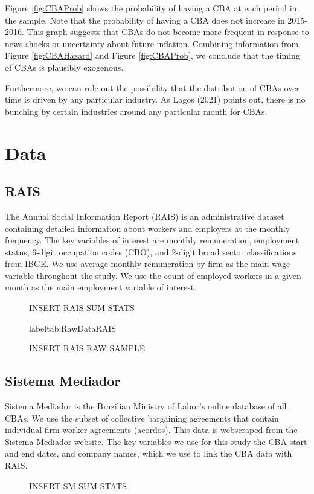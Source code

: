 \documentclass[12pt]{article}
\begin{document}
		Figure \ref{fig:CBAProb} shows the probability of having a CBA at each period in the sample. Note that the probability of having a CBA does not increase in 2015-2016. This graph suggests that CBAs do not become more frequent in response to news shocks or uncertainty about future inflation.
		Combining information from Figure \ref{fig:CBAHazard} and Figure \ref{fig:CBAProb}, we conclude that the timing of CBAs is plausibly exogenous. 

		Furthermore, we can rule out the possibility that the distribution of CBAs over time is driven by any particular industry. As Lagos (2021) points out, there is no bunching by certain industries around any particular month for CBAs.
	\section{Data}
		\subsection{RAIS}
		The Annual Social Information Report (RAIS) is an administrative dataset containing detailed information about workers and employers at the monthly frequency. The key variables of interest are monthly remuneration, employment status, 6-digit occupation codes (CBO), and 2-digit broad sector classifications from IBGE. We use average monthly remuneration by firm as the main wage variable throughout the study. We use the count of employed workers in a given month as the main employment variable of interest. 
		\begin{figure}
			\centering
			\caption{INSERT RAIS SUM STATS}
			\label{tab:SumStatsRAIS}
		\end{figure}

		\begin{figure}
			\centering
			\caption{INSERT RAIS RAW SAMPLE}
			label{tab:RawDataRAIS}
		\end{figure}

		\subsection{Sistema Mediador}
		Sistema Mediador is the Brazilian Ministry of Labor's online database of all CBAs. We use the subset of collective bargaining agreements that contain individual firm-worker agreements (acordos). This data is webscraped from the Sistema Mediador website. The key variables we use for this study the CBA start and end dates, and company names, which we use to link the CBA data with RAIS.
		\begin{figure}
			\centering
			\caption{INSERT SM SUM STATS}
			\label{tab:SumStatsRAIS}
		\end{figure}
\end{document}
